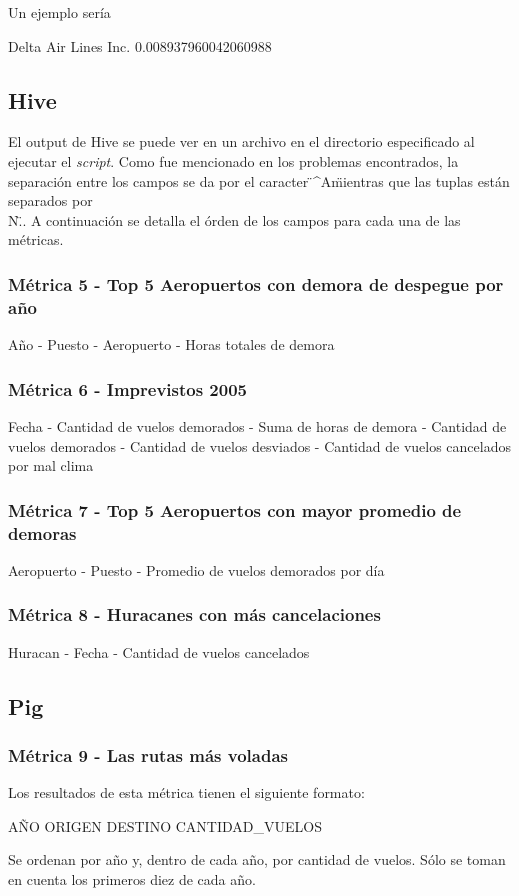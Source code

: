 \documentclass[a4paper,10pt]{article}
\begin{document}
            Un ejemplo sería\\
            \begin{center}
               Delta Air Lines Inc.    0.008937960042060988\\
            \end{center}

        \subsection{Hive}
        El output de Hive se puede ver en un archivo en el directorio especificado al ejecutar el \textit{script}. Como fue mencionado en los problemas encontrados, la separación entre los campos se da por el caracter \"^A\" mientras que las tuplas están separados por \"\\N\"..
        A continuación se detalla el órden de los campos para cada una de las métricas.
        \subsubsection{Métrica 5 - Top 5 Aeropuertos con demora de despegue por año}
        Año - Puesto - Aeropuerto - Horas totales de demora
        \subsubsection{Métrica 6 - Imprevistos 2005}
        Fecha - Cantidad de vuelos demorados - Suma de horas de demora - Cantidad de vuelos demorados - Cantidad de vuelos desviados - Cantidad de vuelos cancelados por mal clima
        \subsubsection{Métrica 7 - Top 5 Aeropuertos con mayor promedio de demoras}
        Aeropuerto - Puesto - Promedio de vuelos demorados por día
        \subsubsection{Métrica 8 - Huracanes con más cancelaciones}
        Huracan - Fecha - Cantidad de vuelos cancelados




    \subsection{Pig}
       \subsubsection{Métrica 9 - Las rutas más voladas}
            Los resultados de esta métrica tienen el siguiente formato:\\
            \begin{center}
                AÑO ORIGEN DESTINO CANTIDAD\_VUELOS
            \end{center}
            Se ordenan por año y, dentro de cada año, por cantidad de vuelos. Sólo se toman en cuenta los primeros diez de cada año.
\end{document}
